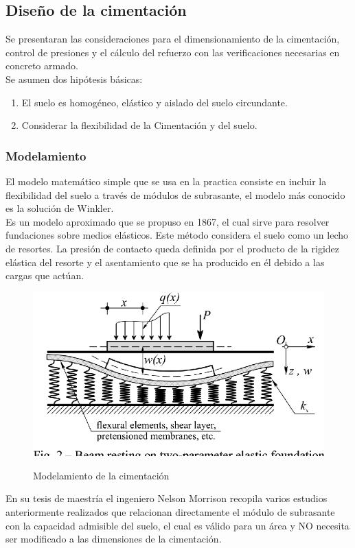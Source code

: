 \subsection{Diseño de la cimentación}
Se presentaran las consideraciones para el dimensionamiento de la cimentación, control de presiones y el cálculo del refuerzo con las verificaciones necesarias en concreto armado.\\
Se asumen dos hipótesis básicas:
\begin{enumerate}
    \item El suelo es homogéneo, elástico y aislado del suelo circundante.
    \item Considerar la flexibilidad de la Cimentación y del suelo.
\end{enumerate}

\subsubsection{Modelamiento}
El modelo matemático simple que se usa en la practica consiste en incluir la flexibilidad del suelo a través de módulos de subrasante, el modelo más conocido es la solución de Winkler.\\
Es un modelo aproximado que se propuso en 1867, el cual sirve para resolver fundaciones sobre medios elásticos. Este método considera el suelo como un lecho de resortes. La presión de contacto queda definida por el producto de la rigidez elástica del resorte y el asentamiento que se ha producido en él debido a las cargas que actúan.\\

\begin{figure}[h!]
    \centering
    \caption{Modelamiento de la cimentación}
    \includegraphics[trim={0 0.5cm 0 0},clip,scale=0.6]{IMAGENES/safe2.png}
    \label{atrans}
\end{figure} 
\newpage
En su tesis de maestría el ingeniero Nelson Morrison recopila varios estudios anteriormente realizados que relacionan directamente el módulo de subrasante con la capacidad admisible del suelo, el cual es válido para un área y NO necesita ser modificado a las dimensiones de la cimentación.

